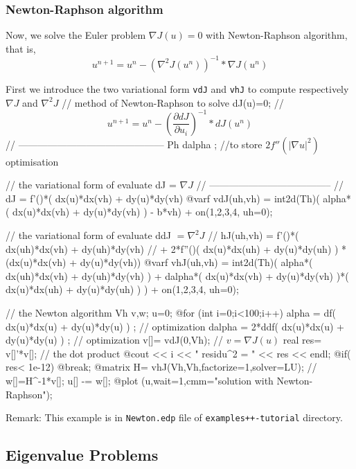 \documentclass[a4paper,twoside,12pt]{book}
\def\p{\partial}
\begin{document}
\subsubsection{Newton-Raphson algorithm}

Now, we solve the Euler problem $ \nabla J (u) = 0$
with Newton-Raphson algorithm, that is,
$$
u^{n+1} = u^n - ( \nabla^2 J (u^{n}))^{-1}*\nabla J(u^n)
$$

First we introduce the two variational form \texttt{vdJ} and \texttt{vhJ} to
compute respectively $ \nabla J$ and $ \nabla^2 J$
\bFF
//   method of  Newton-Raphson to solve dJ(u)=0; \hfilll
//    $$ u^{n+1} = u^n - (\frac{\p dJ}{\p u_i})^{-1}*dJ(u^n) $$ \hfilll
//   --------------------------------------------- \hfilll
  Ph dalpha ; //to store  $2 f''( |\nabla u|^2) $  optimisation


  // the variational form of evaluate  dJ = $ \nabla J$ \hfilll
  // -------------------------------------- \hfilll
  //  dJ =  f'()*( dx(u)*dx(vh) + dy(u)*dy(vh) \hfilll
  @varf vdJ(uh,vh) =  int2d(Th)( alpha*( dx(u)*dx(vh) + dy(u)*dy(vh) ) - b*vh)
  + on(1,2,3,4, uh=0);


  // the variational form of evaluate  ddJ   $= \nabla^2 J$ \hfilll
  // hJ(uh,vh) =    f'()*( dx(uh)*dx(vh) + dy(uh)*dy(vh) \hfilll
  //            + 2*f''()( dx(u)*dx(uh) + dy(u)*dy(uh) ) * (dx(u)*dx(vh) + dy(u)*dy(vh)) \hfilll
  @varf vhJ(uh,vh) = int2d(Th)( alpha*( dx(uh)*dx(vh) + dy(uh)*dy(vh) )
   +  dalpha*( dx(u)*dx(vh) + dy(u)*dy(vh)  )*( dx(u)*dx(uh) + dy(u)*dy(uh) ) )
   + on(1,2,3,4, uh=0);

 // the Newton algorithm \hfilll
  Vh v,w;
  u=0;
  @for (int i=0;i<100;i++)
   {
    alpha =     df( dx(u)*dx(u) + dy(u)*dy(u) ) ; // optimization
    dalpha = 2*ddf( dx(u)*dx(u) + dy(u)*dy(u) ) ; // optimization
    v[]= vdJ(0,Vh);  // $ v = \nabla J(u) $
    real res= v[]'*v[]; // the dot product
    @cout << i <<  " residu^2 = " <<  res  << endl;
    @if( res< 1e-12) @break;
    @matrix H= vhJ(Vh,Vh,factorize=1,solver=LU); //
    w[]=H^-1*v[];
    u[] -= w[];
   }
   @plot (u,wait=1,cmm="solution with Newton-Raphson");
\eFF


Remark: This  example is in \texttt{Newton.edp} file of \texttt{examples++-tutorial} directory.

\newpage
\subsection{Eigenvalue Problems}
\end{document}
